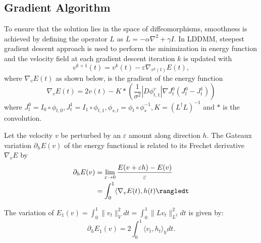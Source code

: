 \documentclass{article}
\theoremstyle{definition}
\theoremstyle{plain}
\begin{document}
\subsection{Gradient Algorithm}
To ensure that the solution lies in the space of diffeomorphisms, smoothness is achieved by defining the operator $L$ as $L=-\alpha\nabla^2+\gamma I$. In LDDMM, steepest gradient descent approach is used to perform the minimization in energy function and the velocity field at each gradient descent iteration $k$ is updated with
\begin{equation*}
    v^{k+1}(t)=v^k(t)-\varepsilon\nabla_{v^k(t)}E(t),
\end{equation*}
where $\nabla_vE(t)$ as shown below, is the gradient of the energy function
\begin{equation}
    \nabla_vE(t)=2v(t)-K*\left(\frac{1}{\sigma^2}|D\phi_{t,1}^v|\nabla J^0_t(J^0_t-J^1_t)\right)
\end{equation}
where $J^0_t=I_0\circ\phi_{t,0}, J^1_t=I_1\circ\phi_{t,1}, \phi_{s,t}=\phi_t\circ\phi^{-1}_s, K=(L^\dagger L)^{-1}$ and $*$ is the convolution.

Let the velocity $v$ be perturbed by an $\varepsilon$ amount along direction $h$. The Gateaux variation $\partial_hE(v)$ of the energy functional is related to its Frechet derivative $\nabla_vE$ by
\begin{align*}
    \partial_hE(v)&=\lim_{\varepsilon\rightarrow 0}\frac{E(v+\varepsilon h)-E(v)}{\varepsilon}\\
    &=\int^1_0\langle\nabla_vE(t),h(t)\rangledt
\end{align*}

The variation of $E_1(v)=\int^1_0\|v_t\|^2_Vdt=\int^1_0\|Lv_t\|^2_{L^2}dt$ is given by:
\begin{equation*}
    \partial_hE_1(v)=2\int^1_0\langle v_t,h_t\rangle_Vdt.
\end{equation*}
\end{document}
